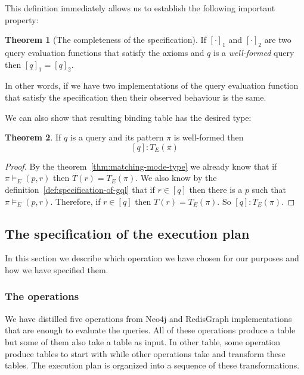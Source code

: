 \documentclass[14pt]{constructor-thesis}
\theoremstyle{definition}
\newtheorem{theorem}{Theorem}
\begin{document}
This definition immediately allows us to establish the following important property:
\begin{theorem}[The completeness of the specification]
  If $[\cdot]_1$ and $[\cdot]_2$ are two query evaluation functions that satisfy the axioms and $q$ is a \textit{well-formed} query then $[q]_1 = [q]_2$.
\end{theorem}

In other words, if we have two implementations of the query evaluation function that satisfy the specification then their observed behaviour is the same.

We can also show that resulting binding table has the desired type:
\begin{theorem}
  If $q$ is a query and its pattern $\pi$ is well-formed then
  $$[q] : T_E(\pi)$$
\end{theorem}
\begin{proof}
  By the theorem~\ref{thm:matching-mode-type} we already know that if $\pi \models_E (p, r)$ then $T(r) = T_E(\pi)$. We also know by the definition~\ref{def:specification-of-gql} that if $r \in [q]$ then there is a $p$ such that $\pi \models_E (p, r)$. Therefore, if $r \in [q]$ then $T(r) = T_E(\pi)$. So $[q] : T_E(\pi)$.
\end{proof}

\subsection{The specification of the execution plan}

In this section we describe which operation we have chosen for our purposes and how we have specified them.

\subsubsection{The operations}

We have distilled five operations from Neo4j and RedisGraph implementations that are enough to evaluate the queries. All of these operations produce a table but some of them also take a table as input. In other table, some operation produce tables to start with while other operations take and transform these tables. The execution plan is organized into a sequence of these transformations.
\end{document}

